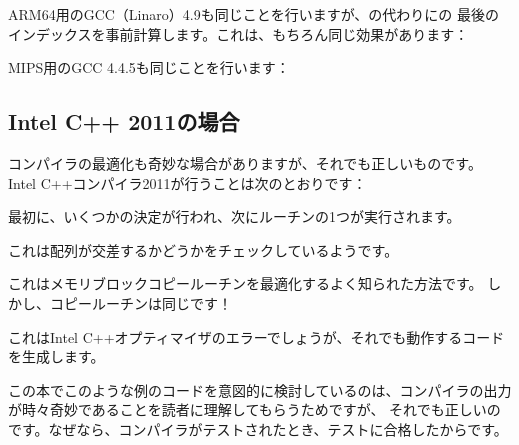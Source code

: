 ARM64用のGCC（Linaro）4.9も同じことを行いますが、の代わりにの
最後のインデックスを事前計算します。これは、もちろん同じ効果があります：




MIPS用のGCC 4.4.5も同じことを行います：



\subsection{Intel C++ 2011の場合}
\myindex{\CompilerAnomaly}
\label{loops_iterators_loop_anomaly}

コンパイラの最適化も奇妙な場合がありますが、それでも正しいものです。
Intel C++コンパイラ2011が行うことは次のとおりです：



最初に、いくつかの決定が行われ、次にルーチンの1つが実行されます。

これは配列が交差するかどうかをチェックしているようです。

これはメモリブロックコピールーチンを最適化するよく知られた方法です。
しかし、コピールーチンは同じです！

これはIntel C++オプティマイザのエラーでしょうが、それでも動作するコードを生成します。

この本でこのような例のコードを意図的に検討しているのは、コンパイラの出力が時々奇妙であることを読者に理解してもらうためですが、
それでも正しいのです。なぜなら、コンパイラがテストされたとき、テストに合格したからです。